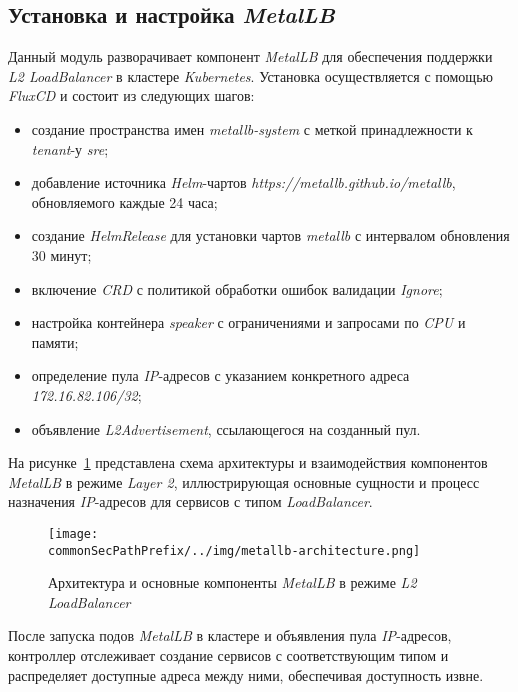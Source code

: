 \subsection{Установка и настройка \textit{MetalLB}}

Данный модуль разворачивает компонент \textit{MetalLB} для обеспечения поддержки \textit{L2 LoadBalancer} в кластере \textit{Kubernetes}. Установка осуществляется с помощью \textit{FluxCD} и состоит из следующих шагов:

\begin{itemize}
    \item создание пространства имен \textit{metallb-system} с меткой принадлежности к \textit{tenant}-у \textit{sre};
    \item добавление источника \textit{Helm}-чартов \textit{https://metallb.github.io/metallb}, обновляемого каждые 24 часа;
    \item создание \textit{HelmRelease} для установки чартов \textit{metallb} с интервалом обновления 30 минут;
    \item включение \textit{CRD} с политикой обработки ошибок валидации \textit{Ignore};
    \item настройка контейнера \textit{speaker} с ограничениями и запросами по \textit{CPU} и памяти;
    \item определение пула \textit{IP}-адресов с указанием конкретного адреса \textit{172.16.82.106/32};
    \item объявление \textit{L2Advertisement}, ссылающегося на созданный пул.
\end{itemize}

На рисунке~\ref{fig:metallb-architecture} представлена схема архитектуры и взаимодействия компонентов \textit{MetalLB} в режиме \textit{Layer 2}, иллюстрирующая основные сущности и процесс назначения \textit{IP}-адресов для сервисов с типом \textit{LoadBalancer}.

\begin{figure}[ht]
    \centering
    \texttt{[image: \\commonSecPathPrefix/../img/metallb-architecture.png]}
    \caption{Архитектура и основные компоненты \textit{MetalLB} в режиме \textit{L2 LoadBalancer}}
    \label{fig:metallb-architecture}
\end{figure}

После запуска подов \textit{MetalLB} в кластере и объявления пула \textit{IP}-адресов, контроллер отслеживает создание сервисов с соответствующим типом и распределяет доступные адреса между ними, обеспечивая доступность извне.

